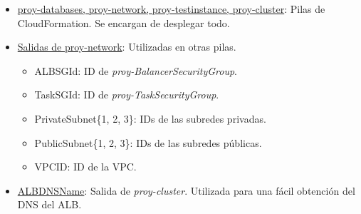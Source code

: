 \begin{itemize}
    \item \underline{proy-databases, proy-network, proy-testinstance, proy-cluster}: Pilas de CloudFormation. Se encargan de desplegar todo.

    \item \underline{Salidas de proy-network}: Utilizadas en otras pilas.
    \begin{itemize}
        \item ALBSGId: ID de \textit{proy-BalancerSecurityGroup}.
        \item TaskSGId: ID de \textit{proy-TaskSecurityGroup}.
        \item PrivateSubnet\{1, 2, 3\}: IDs de las subredes privadas.
        \item PublicSubnet\{1, 2, 3\}: IDs de las subredes públicas.
        \item VPCID: ID de la VPC.
    \end{itemize}

    \item \underline{ALBDNSName}: Salida de \textit{proy-cluster}. Utilizada para una fácil obtención del DNS del ALB.
\end{itemize}
